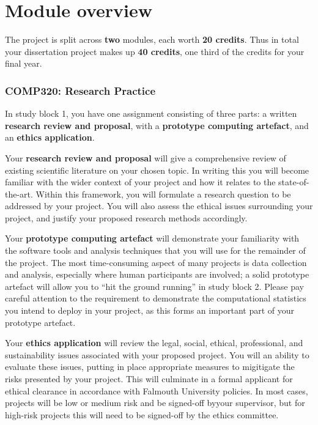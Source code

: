 \section*{Module overview}

The project is split across \textbf{two} modules, each worth \textbf{20 credits}.
Thus in total your dissertation project makes up \textbf{40 credits}, one third of the credits for your final year.

\subsubsection*{COMP320: Research Practice}

In study block 1, you have one assignment consisting of three parts: a written \textbf{research review and proposal},
with a \textbf{prototype computing artefact}, and an \textbf{ethics application}.

Your \textbf{research review and proposal} will give a comprehensive review of existing scientific literature
on your chosen topic. In writing this you will become familiar with the wider context of your project
and how it relates to the state-of-the-art.
Within this framework, you will formulate a research question to be addressed by your project.
You will also assess the ethical issues surrounding your project, and justify your proposed research methods accordingly.

Your \textbf{prototype computing artefact} will demonstrate your familiarity with the software tools and analysis techniques
that you will use for the remainder of the project.
The most time-consuming aspect of many projects is data collection and analysis,
especially where human participants are involved;
a solid prototype artefact will allow you to ``hit the ground running'' in study block 2. Please pay careful attention
to the requirement to demonstrate the computational statistics you intend to deploy in your project, as this forms
an important part of your prototype artefact.

Your \textbf{ethics application} will review the legal, social, ethical, professional, and sustainability issues associated with your proposed project. You will an ability to evaluate these issues, putting in place appropriate measures to migitigate the risks presented by your project. This will culminate in a formal applicant for ethical clearance in accordance with Falmouth University policies. In most cases, projects will be low or medium risk and be signed-off byyour supervisor, but for high-risk projects this will need to be signed-off by the ethics committee.

